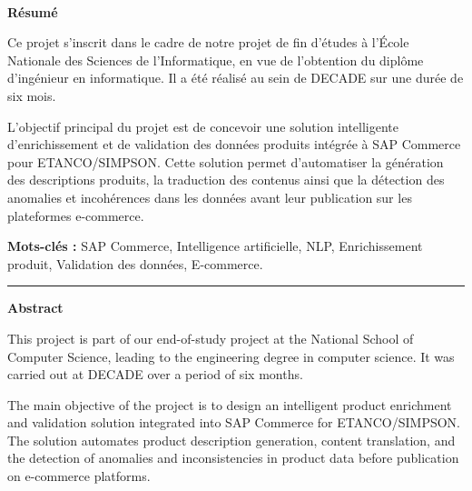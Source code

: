 ﻿﻿\documentclass[12pt,a4paper]{report}
\begin{document}


\clearpage



\clearpage


\begin{center}
{\Large \textbf{Résumé}} \\[0.5cm]
\end{center}

Ce projet s’inscrit dans le cadre de notre projet de fin d’études à l’École Nationale des Sciences de l’Informatique, en vue de l’obtention du diplôme d’ingénieur en informatique. Il a été réalisé au sein de DECADE sur une durée de six mois.

L’objectif principal du projet est de concevoir une solution intelligente d’enrichissement et de validation des données produits intégrée à SAP Commerce pour ETANCO/SIMPSON. Cette solution permet d’automatiser la génération des descriptions produits, la traduction des contenus ainsi que la détection des anomalies et incohérences dans les données avant leur publication sur les plateformes e-commerce.

\vspace{0.3cm}

\textbf{Mots-clés :} SAP Commerce, Intelligence artificielle, NLP, Enrichissement produit, Validation des données, E-commerce.

\noindent\rule{\textwidth}{0.4pt}


\begin{center}
{\Large \textbf{Abstract}} \\[0.5cm]
\end{center}

This project is part of our end-of-study project at the National School of Computer Science, leading to the engineering degree in computer science. It was carried out at DECADE over a period of six months.

The main objective of the project is to design an intelligent product enrichment and validation solution integrated into SAP Commerce for ETANCO/SIMPSON. The solution automates product description generation, content translation, and the detection of anomalies and inconsistencies in product data before publication on e-commerce platforms.
\end{document}
